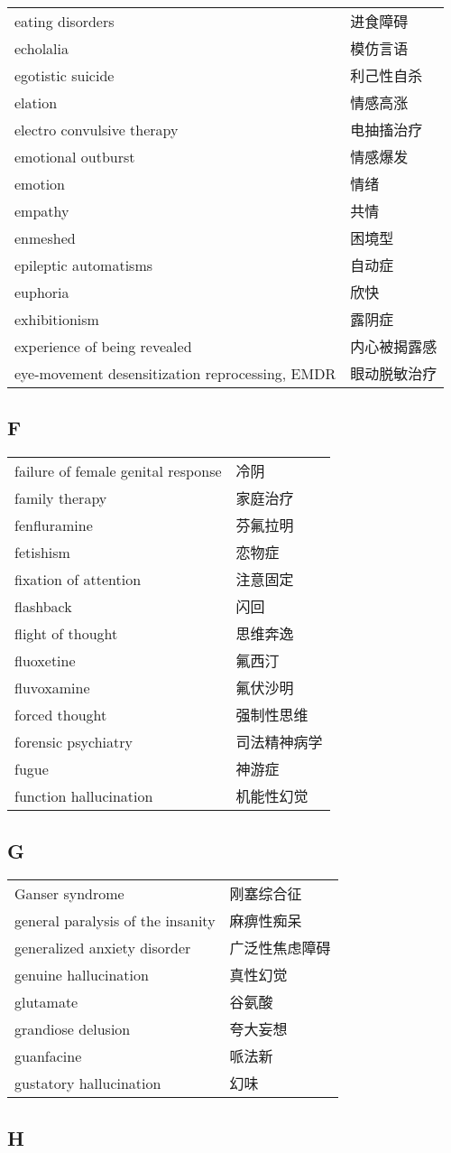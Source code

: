 \begin{longtable}[]{@{}ll@{}}
\toprule
\endhead
eating disorders & 进食障碍\tabularnewline
echolalia & 模仿言语\tabularnewline
egotistic suicide & 利己性自杀\tabularnewline
elation & 情感高涨\tabularnewline
electro convulsive therapy & 电抽搐治疗\tabularnewline
emotional outburst & 情感爆发\tabularnewline
emotion & 情绪\tabularnewline
empathy & 共情\tabularnewline
enmeshed & 困境型\tabularnewline
epileptic automatisms & 自动症\tabularnewline
euphoria & 欣快\tabularnewline
exhibitionism & 露阴症\tabularnewline
experience of being revealed & 内心被揭露感\tabularnewline
eye-movement desensitization reprocessing, EMDR &
眼动脱敏治疗\tabularnewline
\bottomrule
\end{longtable}

\subsection*{F}

\begin{longtable}[]{@{}ll@{}}
\toprule
\endhead
failure of female genital response & 冷阴\tabularnewline
family therapy & 家庭治疗\tabularnewline
fenfluramine & 芬氟拉明\tabularnewline
fetishism & 恋物症\tabularnewline
fixation of attention & 注意固定\tabularnewline
flashback & 闪回\tabularnewline
flight of thought & 思维奔逸\tabularnewline
fluoxetine & 氟西汀\tabularnewline
fluvoxamine & 氟伏沙明\tabularnewline
forced thought & 强制性思维\tabularnewline
forensic psychiatry & 司法精神病学\tabularnewline
fugue & 神游症\tabularnewline
function hallucination & 机能性幻觉\tabularnewline
\bottomrule
\end{longtable}

\subsection*{G}

\begin{longtable}[]{@{}ll@{}}
\toprule
\endhead
Ganser syndrome & 刚塞综合征\tabularnewline
general paralysis of the insanity & 麻痹性痴呆\tabularnewline
generalized anxiety disorder & 广泛性焦虑障碍\tabularnewline
genuine hallucination & 真性幻觉\tabularnewline
glutamate & 谷氨酸\tabularnewline
grandiose delusion & 夸大妄想\tabularnewline
guanfacine & 哌法新\tabularnewline
gustatory hallucination & 幻味\tabularnewline
\bottomrule
\end{longtable}

\subsection*{H}

